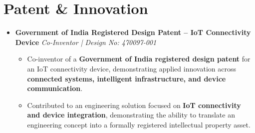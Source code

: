 \documentclass[a4paper,11pt]{article}
\newcommand{\resumeItem}[1]{
    \item \small{#1 \vspace{-2pt}}
}
\begin{document}
\vspace{-10pt}

\section{Patent \& Innovation}

\begin{itemize}[leftmargin=0in, label={}]

\item
\textbf{Government of India Registered Design Patent -- IoT Connectivity Device}
\hfill \textit{Co-Inventor | Design No: 470097-001}

\begin{itemize}[leftmargin=*]

\resumeItem{Co-inventor of a \textbf{Government of India registered design patent} for an IoT connectivity device, demonstrating applied innovation across \textbf{connected systems, intelligent infrastructure, and device communication}.}

\resumeItem{Contributed to an engineering solution focused on \textbf{IoT connectivity and device integration}, demonstrating the ability to translate an engineering concept into a formally registered intellectual property asset.}

\end{itemize}

\end{itemize}

\vspace{-10pt}
\end{document}
